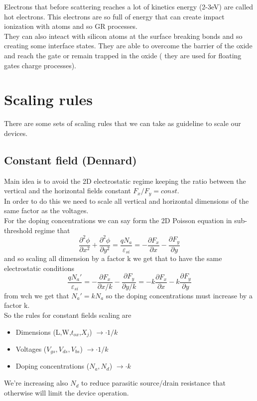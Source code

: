 Electrons that before scattering reaches a lot of kinetics energy (2-3eV) are called hot electrons. This electrons are so full of energy that can create impact ionization with atoms and so GR processes.\\
They can also inteact with silicon atoms at the surface breaking bonds and so creating some interface states. They are able to overcome the barrier of the oxide and reach the gate or remain trapped in the oxide ( they are used for floating gates charge processes).\\



\section{Scaling rules}
There are some sets of scaling rules that we can take as guideline to scale our devices.

\subsection{Constant field (Dennard)}
Main idea is to avoid the 2D electrostatic regime keeping the ratio between the vertical and the horizontal fields constant $F_x/F_y=const.$\\
In order to do this we need to scale all vertical and horizontal dimensions of the same factor as the voltages.\\ 
For the doping concentrations we can say form the 2D Poisson equation in sub-threshold regime that 
\begin{equation}
\frac{\partial^2 \phi}{\partial x^2}+\frac{\partial^2 \phi}{\partial y^2}=\frac{qN_a}{\varepsilon_{si}}=-\frac{\partial F_x}{\partial x}-\frac{\partial F_y}{\partial y}
\end{equation}
and so scaling all dimension by a factor k we get that to have the same electrostatic conditions
\begin{equation}
\frac{qN_a'}{\varepsilon_{si}}=-\frac{\partial F_x}{\partial x/k}-\frac{\partial F_y}{\partial y/k}=-k\frac{\partial F_x}{\partial x}-k\frac{\partial F_y}{\partial y}
\end{equation}
from wch we get that $N_a'=kN_a$ so the doping concentrations must increase by a factor k.\\
So the rules for constant fields scaling are 
\begin{itemize}
  \item Dimensions (L,W,$t_{ox}$,$X_j$)     $\rightarrow \cdot 1/k$
  \item Voltages ($V_{gs},V_{ds},V_{bs}$)   $\rightarrow \cdot 1/k$
  \item Doping concentrations ($N_a,N_d$)   $\rightarrow \cdot k$
\end{itemize}
We're increasing also $N_d$ to reduce parasitic source/drain resistance that otherwise will limit the device operation.\\


